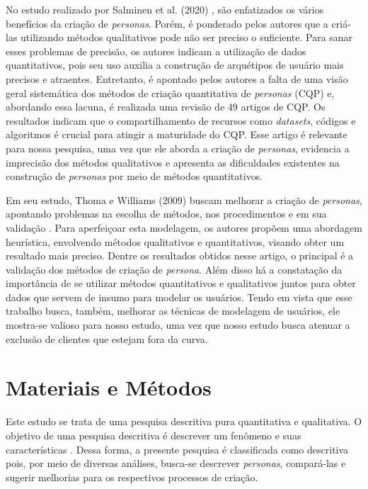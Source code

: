 \documentclass[12pt]{article}
\begin{document}
\par No estudo realizado por Salminen et al. (2020) \cite{10.1145/3313831.3376502}, são enfatizados os vários benefícios da criação de \emph{personas}. Porém, é ponderado pelos autores que a criá-las utilizando métodos qualitativos pode não ser preciso o suficiente. Para sanar esses problemas de precisão, os autores indicam a utilização de dados quantitativos, pois seu uso auxilia a construção de arquétipos de usuário mais precisos e atraentes. Entretanto, é apontado pelos autores a falta de uma visão geral sistemática dos métodos de criação quantitativa de \emph{personas} (CQP) e, abordando essa lacuna, é realizada uma revisão de 49 artigos de CQP. Os resultados indicam que o compartilhamento de recursos como \emph{datasets}, códigos e algoritmos é crucial para atingir a maturidade do CQP. Esse artigo é relevante para nossa pesquisa, uma vez que ele aborda a criação de \emph{personas}, evidencia a imprecisão dos métodos qualitativos e apresenta as dificuldades existentes na construção de \emph{personas} por meio de métodos quantitativos.

\par Em seu estudo, Thoma e Williams (2009) buscam melhorar a criação de \emph{personas}, apontando problemas na escolha de métodos, nos procedimentos e em sua validação \cite{10.1007/978-3-642-03658-3_56}. Para aperfeiçoar esta modelagem, os autores propõem uma abordagem heurística, envolvendo métodos qualitativos e quantitativos, visando obter um resultado mais preciso. Dentre os resultados obtidos nesse artigo, o principal é a validação dos métodos de criação de \emph{persona}. Além disso há a constatação da importância de se utilizar métodos quantitativos e qualitativos juntos para obter dados que servem de insumo para modelar os usuários. Tendo em vista que esse trabalho busca, também, melhorar as técnicas de modelagem de usuários, ele mostra-se valioso para nosso estudo, uma vez que nosso estudo busca atenuar a exclusão de clientes que estejam fora da curva.

\section{Materiais e Métodos} \label{sec:materiaisemetodos}
Este estudo se trata de uma pesquisa descritiva pura quantitativa e qualitativa. O objetivo de uma pesquisa descritiva é descrever um fenômeno e suas características \cite{10.1177/1362168815572747}. Dessa forma, a presente pesquisa é classificada como descritiva pois, por meio de diversas análises, busca-se descrever \emph{personas}, compará-las e sugerir melhorias para os respectivos processos de criação.
\end{document}
